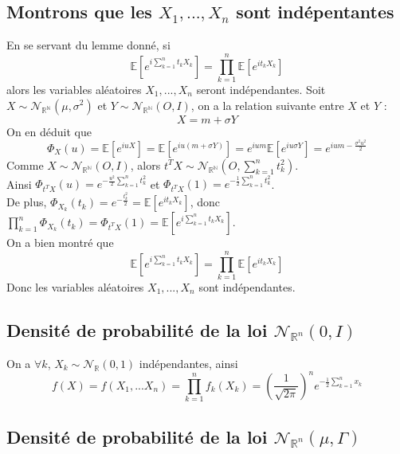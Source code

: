 \documentclass{report}
\begin{document}
		\subsection{Montrons que les $X_1, ..., X_n$ sont indépentantes}
			En se servant du lemme donné, si 
			\[\mathbb{E}[e^{i\sum\limits_{k=1}^{n}t_kX_k}] = \prod\limits_{k=1}^{n}\mathbb{E}[e^{it_kX_k}]\]
			alors les variables aléatoires $X_1, ..., X_n$ seront indépendantes.
			Soit $X \sim \mathcal{N}_{\mathbb{R}^\mathbb{N}}(\mu, \sigma^2)$ et $Y \sim \mathcal{N}_{\mathbb{R}^\mathbb{N}}(O, I)$, on a la relation suivante entre $X$ et $Y$ :
			\[ X = m + \sigma Y \]
			On en déduit que
			\[ \Phi_X(u) = \mathbb{E}[e^{iuX}] = \mathbb{E}[e^{iu(m+\sigma Y)}] = e^{ium}\mathbb{E}[e^{iu\sigma Y}] = e^{ium-\frac{\sigma^2 u^2}{2}} \]
			Comme $X \sim \mathcal{N}_{\mathbb{R}^\mathbb{N}}(O, I)$, alors $t^TX \sim \mathcal{N}_{\mathbb{R}^\mathbb{N}}(O, \sum\limits_{k=1}^{n}t_k^2)$.\\
			Ainsi $\Phi_{t^TX}(u) = e^{-\frac{u^2}{2}\sum\limits_{k=1}^{n}t_k^2}$ et $\Phi_{t^TX}(1) = e^{-\frac{1}{2}\sum\limits_{k=1}^{n}t_k^2}$.\\
			De plus, $\Phi_{X_k}(t_k) = e^{-\frac{t_k^2}{2}} = \mathbb{E}[e^{it_kX_k}] $, donc $\prod\limits_{k=1}^{n}\Phi_{X_k}(t_k) = \Phi_{t^TX}(1) = \mathbb{E}[e^{i\sum\limits_{k=1}^{n}t_kX_k}] $.\\
			On a bien montré que 
			\[\mathbb{E}[e^{i\sum\limits_{k=1}^{n}t_kX_k}] = \prod\limits_{k=1}^{n}\mathbb{E}[e^{it_kX_k}]\]
			Donc les variables aléatoires $X_1, ..., X_n$ sont indépendantes.
		\subsection{Densité de probabilité de la loi $\mathcal{N}_{\mathbb{R}^n}(0, I)$}
			On a $\forall k$, $X_k \sim \mathcal{N}_{\mathbb{R}}(0, 1)$ indépendantes, ainsi
			\[ f(X) = f(X_1, ... X_n) = \prod\limits_{k=1}^{n}f_k(X_k) = (\frac{1}{\sqrt{2\pi}})^ne^{-\frac{1}{2}\sum\limits_{k=1}^{n}x_k} \]
		\subsection{Densité de probabilité de la loi $\mathcal{N}_{\mathbb{R}^n}(\mu, \Gamma)$}
\end{document}
